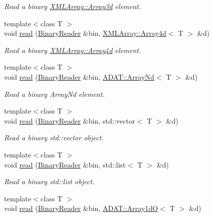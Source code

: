 \begin{DoxyCompactItemize}
\begin{DoxyCompactList}\small\item\em Read a binary \mbox{\hyperlink{classXMLArray_1_1Array3d}{X\+M\+L\+Array\+::\+Array3d}} element. \end{DoxyCompactList}\item 
{\footnotesize template$<$class T $>$ }\\void \mbox{\hyperlink{namespaceADATIO_a0e3333d0774c69f2c6a38b013e23d02b}{read}} (\mbox{\hyperlink{classADATIO_1_1BinaryReader}{Binary\+Reader}} \&bin, \mbox{\hyperlink{classXMLArray_1_1Array4d}{X\+M\+L\+Array\+::\+Array4d}}$<$ T $>$ \&d)
\begin{DoxyCompactList}\small\item\em Read a binary \mbox{\hyperlink{classXMLArray_1_1Array4d}{X\+M\+L\+Array\+::\+Array4d}} element. \end{DoxyCompactList}\item 
{\footnotesize template$<$class T $>$ }\\void \mbox{\hyperlink{namespaceADATIO_a0b5c3397d644a4f522e7b097825986cb}{read}} (\mbox{\hyperlink{classADATIO_1_1BinaryReader}{Binary\+Reader}} \&bin, \mbox{\hyperlink{classADAT_1_1ArrayNd}{A\+D\+A\+T\+::\+Array\+Nd}}$<$ T $>$ \&d)
\begin{DoxyCompactList}\small\item\em Read a binary Array\+Nd element. \end{DoxyCompactList}\item 
{\footnotesize template$<$class T $>$ }\\void \mbox{\hyperlink{namespaceADATIO_a6f8814a83922a0b41bf9a25627b5dcfd}{read}} (\mbox{\hyperlink{classADATIO_1_1BinaryReader}{Binary\+Reader}} \&bin, std\+::vector$<$ T $>$ \&d)
\begin{DoxyCompactList}\small\item\em Read a binary std\+::vector object. \end{DoxyCompactList}\item 
{\footnotesize template$<$class T $>$ }\\void \mbox{\hyperlink{namespaceADATIO_a6b74b694d784ffa233957d276d10528d}{read}} (\mbox{\hyperlink{classADATIO_1_1BinaryReader}{Binary\+Reader}} \&bin, std\+::list$<$ T $>$ \&d)
\begin{DoxyCompactList}\small\item\em Read a binary std\+::list object. \end{DoxyCompactList}\item 
{\footnotesize template$<$class T $>$ }\\void \mbox{\hyperlink{namespaceADATIO_aee4123faea4044073f3c166dab12cb9e}{read}} (\mbox{\hyperlink{classADATIO_1_1BinaryReader}{Binary\+Reader}} \&bin, \mbox{\hyperlink{classADAT_1_1Array1dO}{A\+D\+A\+T\+::\+Array1dO}}$<$ T $>$ \&d)

\end{DoxyCompactItemize}
